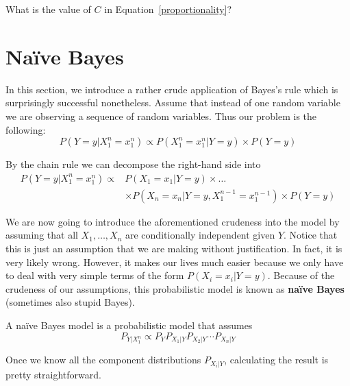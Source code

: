 \begin{Exercise}
What is the value of $ C $ in Equation~\eqref{proportionality}?
\end{Exercise}



\section{Na\"ive Bayes}
In this section, we introduce a rather crude application of Bayes's rule which is surprisingly successful nonetheless.
Assume that instead of one random variable we are observing a sequence of random variables. Thus our problem is the following:
\begin{equation}
P(Y=y|X_{1}^{n}=x_{1}^{n}) \propto P(X_{1}^{n}=x_{1}^{n}|Y=y) \times P(Y=y) 
\end{equation}

By the chain rule we can decompose the right-hand side into
\begin{align}
P(Y=y|X_{1}^{n}=x_{1}^{n})
\propto &P(X_{1}=x_{1}|Y=y) \times \ldots \nonumber \\
&\times P(X_{n}=x_{n}|Y=y,X_{1}^{n-1}=x_1^{n-1}) \times P(Y=y) \nonumber
\end{align}

We are now going to introduce the aforementioned crudeness into the model by assuming that all $ X_1,\ldots,X_n$ are conditionally independent given $ Y $. Notice that
this is just an assumption that we are making without justification. In fact, it is very likely wrong. However, it makes our
lives much easier because we only have to deal with very simple terms of the form $ P(X_{i}=x_{i}|Y=y) $. Because of the
crudeness of our assumptions, this probabilistic model is known as \textbf{na\"ive Bayes} (sometimes also 
stupid Bayes).

\begin{Definition}
A na\"ive Bayes model is a probabilistic model that assumes
$$ P_{Y|X_{1}^{n}} \propto P_Y P_{X_{1}|Y} P_{X_{2}|Y} \cdots P_{X_{n}|Y} $$
\end{Definition}
Once we know all the component distributions $P_{X_i|Y}$, calculating the result is pretty straightforward. 

